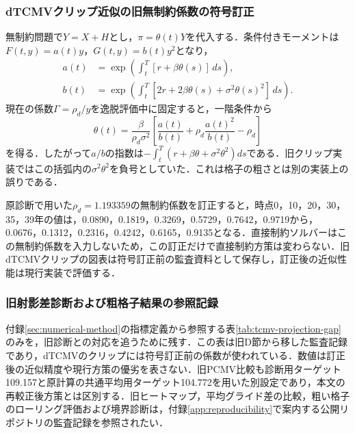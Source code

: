 \documentclass[10pt,a4paper]{article}
\theoremstyle{plain}
\theoremstyle{definition}
\begin{document}
\subsubsection{dTCMVクリップ近似の旧無制約係数の符号訂正}
無制約問題で$Y=X+H$とし，$\pi=\theta(t)Y$を代入する．条件付きモーメントは$F(t,y)=a(t)y$，$G(t,y)=b(t)y^2$となり，
\begin{align}
a(t)&=\exp\!\left(\int_t^T[r+\beta\theta(s)]\,ds\right),\\
b(t)&=\exp\!\left(\int_t^T[2r+2\beta\theta(s)+\sigma^2\theta(s)^2]\,ds\right).
\end{align}
現在の係数$\Gamma=\rho_d/y$を逸脱評価中に固定すると，一階条件から
\begin{equation}
\theta(t)=\frac{\beta}{\rho_d\sigma^2}
\left[\frac{a(t)}{b(t)}+\rho_d\frac{a(t)^2}{b(t)}-\rho_d\right]
\end{equation}
を得る．したがって$a/b$の指数は$-\int_t^T(r+\beta\theta+\sigma^2\theta^2)ds$である．旧クリップ実装ではこの括弧内の$\sigma^2\theta^2$を負号としていた．これは格子の粗さとは別の実装上の誤りである．

原診断で用いた$\rho_d=1.193359$の無制約係数を訂正すると，時点0，10，20，30，35，39年の値は，0.0890，0.1819，0.3269，0.5729，0.7642，0.9719から，0.0676，0.1312，0.2316，0.4242，0.6165，0.9135となる．直接制約ソルバーはこの無制約係数を入力しないため，この訂正だけで直接制約方策は変わらない．旧dTCMVクリップの図表は符号訂正前の監査資料として保存し，訂正後の近似性能は現行実装で評価する．

\clearpage
\subsubsection{旧射影差診断および粗格子結果の参照記録}
付録\ref{sec:numerical-method}の指標定義から参照する表\ref{tab:tcmv-projection-gap}のみを，旧診断との対応を追うために残す．この表は旧D節から移した監査記録であり，dTCMVのクリップには符号訂正前の係数が使われている．数値は訂正後の近似精度や現行方策の優劣を表さない．旧PCMV比較も診断用ターゲット109.157と原計算の共通平均用ターゲット104.772を用いた別設定であり，本文の再較正後方策とは区別する．旧ヒートマップ，平均グライド差の比較，粗い格子のローリング評価および境界診断は，付録\ref{app:reproducibility}で案内する公開リポジトリの監査記録を参照されたい．
\end{document}
